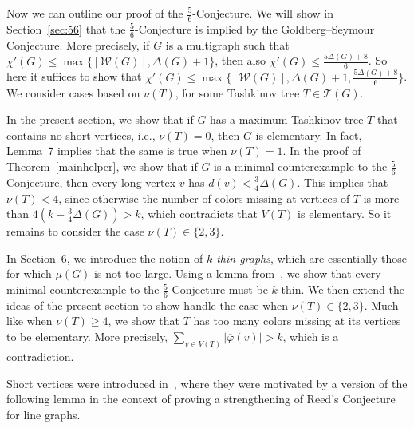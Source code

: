 \documentclass[12pt]{amsart}
\theoremstyle{plain}
\theoremstyle{definition}
\theoremstyle{remark}
\newcommand{\fancy}[1]{\mathcal{#1}}
\newcommand{\W}{\fancy{W}}
\newcommand{\T}{\fancy{T}}
\newcommand{\ceil}[1]{\left\lceil#1\right\rceil}
\newcommand{\floor}[1]{\left\lfloor#1\right\rfloor}
\newcommand{\vphn}{\overline{\varphi}}
\begin{document}
Now we can outline our proof of the $\frac56$-Conjecture.
We will show in Section~\ref{sec:56} that the $\frac56$-Conjecture is implied
by the Goldberg--Seymour Conjecture.  More precisely, if $G$ is a multigraph
such that $\chi'(G)\le\max\{\ceil{\W(G)},\Delta(G)+1\}$, then also $\chi'(G)\le
\frac{5\Delta(G)+8}6$.  So here it suffices to show that 
$\chi'(G)\le\max\{\ceil{\W(G)},\Delta(G)+1,\frac{5\Delta(G)+8}6\}$.  We consider
cases based on $\nu(T)$, for some Tashkinov tree $T\in \T(G)$.

In the present section, we show that if $G$ has a maximum Tashkinov tree $T$ that contains
no short vertices, i.e., $\nu(T)=0$, then $G$ is elementary.  In fact, Lemma~7
implies that the same is true when $\nu(T)=1$.  In the proof of
Theorem~\ref{mainhelper}, we show that if $G$ is a minimal counterexample to
the $\frac56$-Conjecture, then every long vertex $v$ has
$d(v)<\frac34\Delta(G)$.  This implies that $\nu(T)< 4$, since otherwise
the number of colors missing at vertices of $T$ is more than
$4(k-\frac34\Delta(G))>k$, which contradicts that $V(T)$ is elementary.
So it remains to consider the case $\nu(T)\in\{2,3\}$.

In Section~6, we introduce the notion of \emph{$k$-thin graphs}, which are
essentially those for which $\mu(G)$ is not too large.  Using a lemma
from~\cite{rabern2011strengthening}, we show that every minimal counterexample to the
$\frac56$-Conjecture must be $k$-thin.  We then extend the ideas of the present
section to show handle the case when $\nu(T)\in\{2,3\}$.  Much like when
$\nu(T)\ge 4$, we show that $T$ has too many colors missing at its vertices to
be elementary.  More precisely, $\sum_{v\in V(T)}|\vphn(v)|>k$, which is a
contradiction.

Short vertices were introduced in~\cite{CKPS}, where they were motivated by a
version of the following lemma in the context of proving a strengthening of
Reed's Conjecture for line graphs.  
\end{document}
